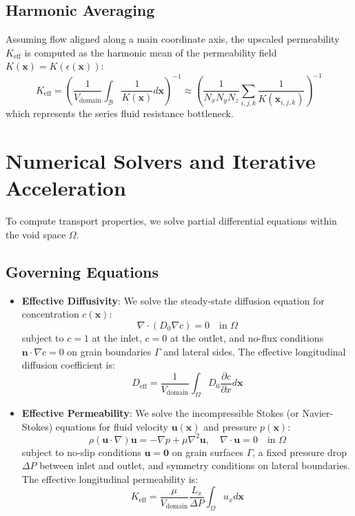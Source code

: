 \documentclass[preprint,12pt]{elsarticle}
\newcommand{\n}{\mathbf{n}}
\newcommand{\x}{\mathbf{x}}
\newcommand{\bfu}{\mathbf{u}}
\begin{document}
\subsection{Harmonic Averaging}
Assuming flow aligned along a main coordinate axis, the upscaled permeability $K_{\text{eff}}$ is computed as the harmonic mean of the permeability field $K(\x) = K(\epsilon(\x))$:
\begin{equation}
\label{eq:harmonic_mean}
K_{\text{eff}} = \left( \frac{1}{V_{\text{domain}}} \int_{\mathcal{B}} \frac{1}{K(\x)} d\x \right)^{-1} \approx \left( \frac{1}{N_x N_y N_z} \sum_{i,j,k} \frac{1}{K(\x_{i,j,k})} \right)^{-1}
\end{equation}
which represents the series fluid resistance bottleneck.

\section{Numerical Solvers and Iterative Acceleration}
\label{sec:solvers}

To compute transport properties, we solve partial differential equations within the void space $\Omega$.

\subsection{Governing Equations}
\begin{itemize}
    \item \textbf{Effective Diffusivity}: We solve the steady-state diffusion equation for concentration $c(\x)$:
    \begin{equation}
    \nabla \cdot (D_0 \nabla c) = 0 \quad \text{in } \Omega
    \end{equation}
    subject to $c = 1$ at the inlet, $c = 0$ at the outlet, and no-flux conditions $\n \cdot \nabla c = 0$ on grain boundaries $\Gamma$ and lateral sides. The effective longitudinal diffusion coefficient is:
    \begin{equation}
    D_{\text{eff}} = \frac{1}{V_{\text{domain}}} \int_{\Omega} D_0 \frac{\partial c}{\partial x} d\x
    \end{equation}
    \item \textbf{Effective Permeability}: We solve the incompressible Stokes (or Navier-Stokes) equations for fluid velocity $\bfu(\x)$ and pressure $p(\x)$:
    \begin{equation}
    \rho (\bfu \cdot \nabla) \bfu = -\nabla p + \mu \nabla^2 \bfu, \quad \nabla \cdot \bfu = 0 \quad \text{in } \Omega
    \end{equation}
    subject to no-slip conditions $\bfu = \mathbf{0}$ on grain surfaces $\Gamma$, a fixed pressure drop $\Delta P$ between inlet and outlet, and symmetry conditions on lateral boundaries. The effective longitudinal permeability is:
    \begin{equation}
    K_{\text{eff}} = \frac{\mu}{V_{\text{domain}}} \frac{L_x}{\Delta P} \int_{\Omega} u_x d\x
    \end{equation}
\end{itemize}
\end{document}
